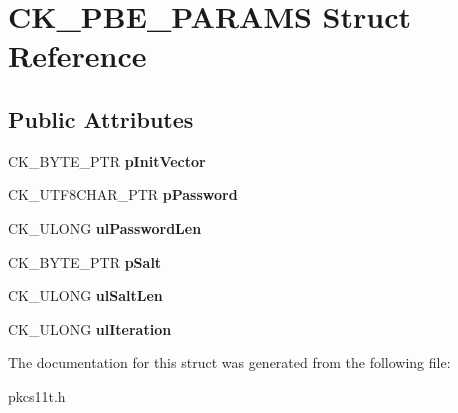 \hypertarget{struct_c_k___p_b_e___p_a_r_a_m_s}{}\section{C\+K\+\_\+\+P\+B\+E\+\_\+\+P\+A\+R\+A\+MS Struct Reference}
\label{struct_c_k___p_b_e___p_a_r_a_m_s}
\subsection*{Public Attributes}
\begin{DoxyCompactItemize}
\item 
\mbox{\label{struct_c_k___p_b_e___p_a_r_a_m_s_af6439037175aecb9ef4b8cd78a25dfce}} 
C\+K\+\_\+\+B\+Y\+T\+E\+\_\+\+P\+TR {\bfseries p\+Init\+Vector}
\item 
\mbox{\label{struct_c_k___p_b_e___p_a_r_a_m_s_a852949cd067d93ed657f77feb19796df}} 
C\+K\+\_\+\+U\+T\+F8\+C\+H\+A\+R\+\_\+\+P\+TR {\bfseries p\+Password}
\item 
\mbox{\label{struct_c_k___p_b_e___p_a_r_a_m_s_a0571a4e448396bcf480e58e3b137e15f}} 
C\+K\+\_\+\+U\+L\+O\+NG {\bfseries ul\+Password\+Len}
\item 
\mbox{\label{struct_c_k___p_b_e___p_a_r_a_m_s_af68023bb005478be6415e430d23cf4a4}} 
C\+K\+\_\+\+B\+Y\+T\+E\+\_\+\+P\+TR {\bfseries p\+Salt}
\item 
\mbox{\label{struct_c_k___p_b_e___p_a_r_a_m_s_ada93c47b07a867140453cce890cd17be}} 
C\+K\+\_\+\+U\+L\+O\+NG {\bfseries ul\+Salt\+Len}
\item 
\mbox{\label{struct_c_k___p_b_e___p_a_r_a_m_s_aef88e5c2a740c2fa2ad542ffc3a7fb50}} 
C\+K\+\_\+\+U\+L\+O\+NG {\bfseries ul\+Iteration}
\end{DoxyCompactItemize}


The documentation for this struct was generated from the following file\+:\begin{DoxyCompactItemize}
\item 
pkcs11t.\+h\end{DoxyCompactItemize}
